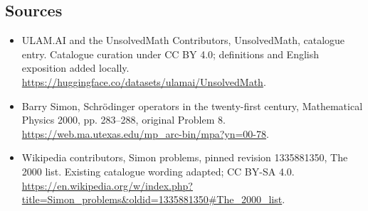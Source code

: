 \documentclass[11pt]{article}
\begin{document}
\subsection{Sources}
\begin{itemize}
\item[\hypertarget{source:statement:1}{S1}] ULAM.AI and the UnsolvedMath Contributors, UnsolvedMath, catalogue entry. Catalogue curation under CC BY 4.0; definitions and English exposition added locally.
\url{https://huggingface.co/datasets/ulamai/UnsolvedMath}.
\item[\hypertarget{source:statement:2}{S2}] Barry Simon, Schrödinger operators in the twenty-first century, Mathematical Physics 2000, pp. 283–288, original Problem 8.
\url{https://web.ma.utexas.edu/mp_arc-bin/mpa?yn=00-78}.
\item[\hypertarget{source:statement:3}{S3}] Wikipedia contributors, Simon problems, pinned revision 1335881350, The 2000 list. Existing catalogue wording adapted; CC BY-SA 4.0.
\url{https://en.wikipedia.org/w/index.php?title=Simon_problems&oldid=1335881350#The_2000_list}.
\end{itemize}
\label{end:statement}
\end{document}
